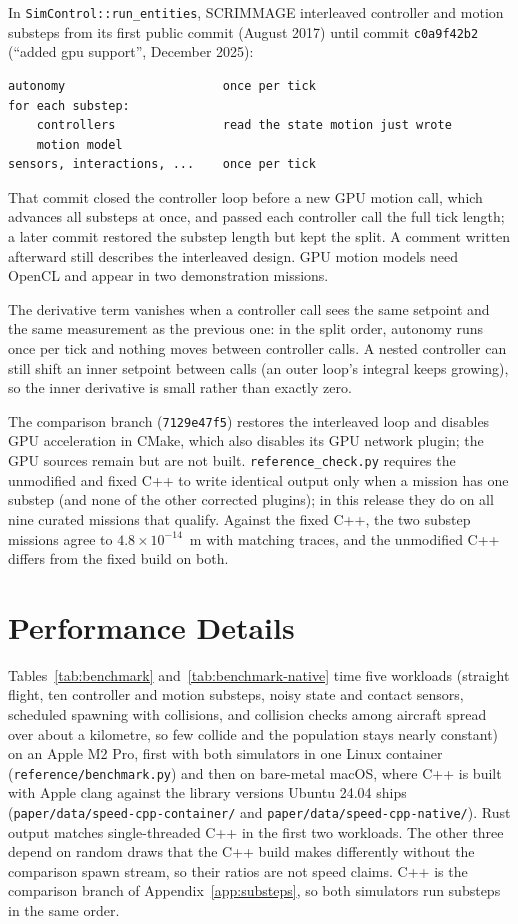 \documentclass[conference]{IEEEtran}
\begin{document}
In \texttt{SimControl::run\_entities}, SCRIMMAGE interleaved controller and
motion substeps from its first public commit (August 2017) until commit
\texttt{c0a9f42b2} (``added gpu support'', December 2025):
\begin{verbatim}
autonomy                      once per tick
for each substep:
    controllers               read the state motion just wrote
    motion model
sensors, interactions, ...    once per tick
\end{verbatim}
That commit closed the controller loop before a new GPU motion call, which
advances all substeps at once, and passed each controller call the full tick
length; a later commit restored the substep length but kept the split. A
comment written afterward still describes the interleaved design. GPU motion
models need OpenCL and appear in two demonstration missions.

The derivative term vanishes when a controller call sees the same setpoint and
the same measurement as the previous one: in the split order, autonomy runs
once per tick and nothing moves between controller calls. A nested controller
can still shift an inner setpoint between calls (an outer loop's integral keeps
growing), so the inner derivative is small rather than exactly zero.

The comparison branch (\texttt{7129e47f5}) restores the interleaved loop and
disables GPU acceleration in CMake, which also disables its GPU network plugin;
the GPU sources remain but are not built. \texttt{reference\_check.py} requires
the unmodified and fixed C++ to write identical output only when a mission has
one substep (and none of the other corrected plugins); in this release they do
on all nine curated missions that qualify. Against the fixed C++, the two
substep missions agree to $4.8\times10^{-14}$~m with matching traces, and the
unmodified C++ differs from the fixed build on both.

\section{Performance Details}
\label{app:performance}

Tables~\ref{tab:benchmark} and~\ref{tab:benchmark-native} time five workloads
(straight flight, ten controller and motion substeps, noisy state and contact
sensors, scheduled spawning with collisions, and collision checks among aircraft
spread over about a kilometre, so few collide and the population stays nearly
constant) on an Apple M2 Pro, first with
both simulators in one Linux container (\texttt{reference/benchmark.py}) and
then on bare-metal macOS, where C++ is built with Apple clang
against the library versions Ubuntu 24.04 ships
(\texttt{paper/data/speed-cpp-container/} and
\texttt{paper/data/speed-cpp-native/}). Rust output matches single-threaded
C++ in the first two workloads. The other three depend on random draws that the
C++ build makes differently without the comparison spawn stream, so their ratios
are not speed claims.
C++ is the comparison branch of Appendix~\ref{app:substeps}, so both simulators
run substeps in the same order.
\end{document}
